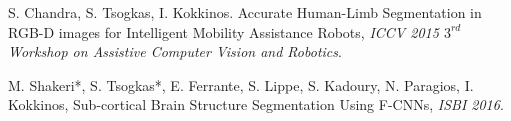 \documentclass[margin]{res}
\begin{document}
\begin{resume}
\begin{thebibliography}{7}
 S. Chandra, S. Tsogkas, I. Kokkinos. Accurate Human-Limb Segmentation in RGB-D images for Intelligent Mobility Assistance Robots, \emph{ICCV 2015 $3^{rd}$ Workshop on Assistive Computer Vision and Robotics}.

 M. Shakeri*, S. Tsogkas*, E. Ferrante, S. Lippe, S. Kadoury, N. Paragios, I. Kokkinos, Sub-cortical Brain Structure Segmentation Using F-CNNs, \emph{ISBI 2016}.

\end{thebibliography}
 
\end{resume}
\end{document}
